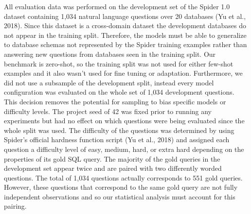 All evaluation data was performed on the development set of the Spider 1.0 dataset containing 1,034 natural language questions over 20 databases (Yu et al., 2018). Since this dataset is a cross-domain dataset the development databases do not appear in the training split. Therefore, the models must be able to generalize to database schemas not represented by the Spider training examples rather than answering new questions from databases seen in the training split. Our benchmark is zero-shot, so the training split was not used for either few-shot examples and it also wasn't used for fine tuning or adaptation. Furthermore, we did not use a subsample of the development split, instead every model configuration was evaluated on the whole set of 1,034 development questions. This decision removes the potential for sampling to bias specific models or difficulty levels. The project seed of 42 was fixed prior to running any experiments but had no effect on which questions were being evaluated since the whole split was used. The difficulty of the questions was determined by using Spider's official hardness function script (Yu et al., 2018) and assigned each question a difficulty level of easy, medium, hard, or extra hard depending on the properties of its gold SQL query. The majority of the gold queries in the development set appear twice and are paired with two differently worded questions. The total of 1,034 questions actually corresponds to 551 gold queries. However, these questions that correspond to the same gold query are not fully independent observations and so our statistical analysis must account for this pairing.

